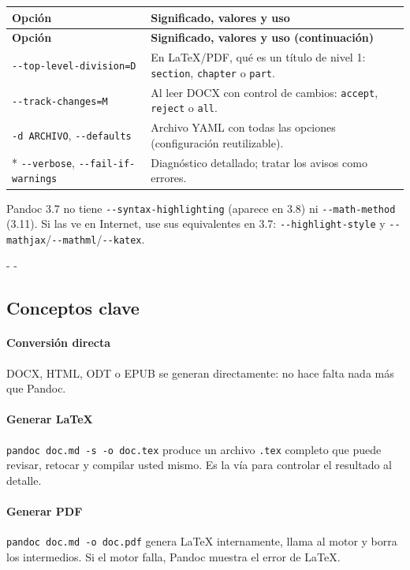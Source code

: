 \documentclass[11pt,a4paper]{article}
\makeatletter
\newcommand{\necesitaespacio}[1]{\par\penalty-100\begingroup
	\setlength{\dimen@}{#1}\dimen@ii\pagegoal\advance\dimen@ii-\pagetotal
	\ifdim\dimen@>\dimen@ii\ifdim\dimen@ii>\z@\vfil\fi\penalty-\@M\fi\endgroup}
\newenvironment{opciones}[1][Opción]{%
	\par\begingroup\small
	\begin{longtable}{L{4.25cm}L{11.2cm}}
		\toprule\rowcolor{tablacab}\cab{#1} & \cab{Significado, valores y uso} \\ \midrule
		\endfirsthead
		\toprule\rowcolor{tablacab}\cab{#1} & \cab{Significado, valores y uso (continuación)} \\ \midrule
		\endhead
		\bottomrule
		\endfoot}
	{\end{longtable}\endgroup}
\newcommand{\cmd}[1]{\texttt{\textcolor{colcmd}{#1}}}      %
\newcommand{\opt}[1]{\texttt{\textcolor{colopt}{#1}}}      %
\newcommand{\arch}[1]{\texttt{\textcolor{colarch}{#1}}}    %
\newcommand{\val}[1]{\texttt{#1}}                          %
\newcommand{\cab}[1]{\textbf{#1}}
\makeatother
\begin{document}
\begin{opciones}
		\opt{-{}-top-\allowbreak{}level-\allowbreak{}division=\allowbreak{}D} & En LaTeX/PDF, qué es un título de nivel 1: \val{section}, \val{chapter} o \val{part}.\\
		\opt{-{}-track-\allowbreak{}changes=\allowbreak{}M} & Al leer DOCX con control de cambios: \val{accept}, \val{reject} o \val{all}.\\
		\opt{-d ARCHIVO}, \opt{-{}-defaults} & Archivo YAML con todas las opciones (configuración reutilizable).\\*
		\opt{-{}-verbose}, \opt{-{}-fail-\allowbreak{}if-\allowbreak{}warnings} & Diagnóstico detallado; tratar los avisos como errores.\\
	\end{opciones}
	
	\begin{nota}
		Pandoc 3.7 no tiene \opt{-{}-syntax-\allowbreak{}highlighting} (aparece en 3.8) ni \opt{-{}-math-method} (3.11). Si las ve en Internet, use sus equivalentes en 3.7: \opt{-{}-highlight-\allowbreak{}style} y \opt{-{}-mathjax}/\opt{-{}-mathml}/\opt{-{}-katex}.
	\end{nota}
	
	\necesitaespacio{8\baselineskip}
	\subsection{Conceptos clave}
	
	\paragraph{Conversión directa} DOCX, HTML, ODT o EPUB se generan directamente: no hace falta nada más que Pandoc.
	
	\paragraph{Generar LaTeX} \cmd{pandoc doc.md -s -o doc.tex} produce un archivo \arch{.tex} completo que puede revisar, retocar y compilar usted mismo. Es la vía para controlar el resultado al detalle.
	
	\paragraph{Generar PDF} \cmd{pandoc doc.md -o doc.pdf} genera LaTeX internamente, llama al motor y borra los intermedios. Si el motor falla, Pandoc muestra el error de LaTeX.
	
\end{document}
